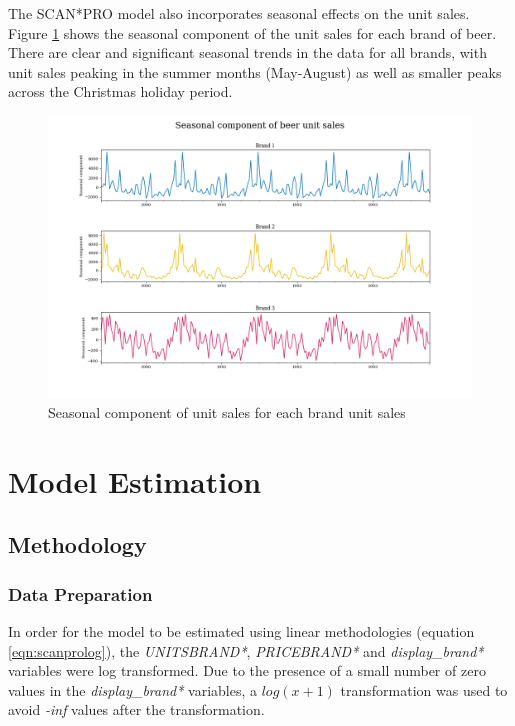\documentclass[a4paper,11pt]{article}
\begin{document}
The SCAN*PRO model also incorporates seasonal effects on the unit sales. Figure \ref{fig:seasonal-plots} shows the seasonal component of the unit sales for each brand of beer. There are clear and significant seasonal trends in the data for all brands, with unit sales peaking in the summer months (May-August) as well as smaller peaks across the Christmas holiday period.


\begin{figure}
  \centering
  \includegraphics[scale=0.38]{seasonal_plots}
  \caption{Seasonal component of unit sales for each brand unit sales}\label{fig:seasonal-plots}
\end{figure}


\section{Model Estimation}
\subsection{Methodology}

\subsubsection{Data Preparation}
In order for the model to be estimated using linear methodologies (equation \ref{eqn:scanprolog}), the \textit{UNITSBRAND*}, \textit{PRICEBRAND*} and \textit{display\_brand*} variables were log transformed. Due to the presence of a small number of zero values in the \textit{display\_brand*} variables, a $log(x+1)$ transformation \citep{wooldridge_multiple_2016} was used to avoid \textit{-inf} values after the transformation.
\end{document}
